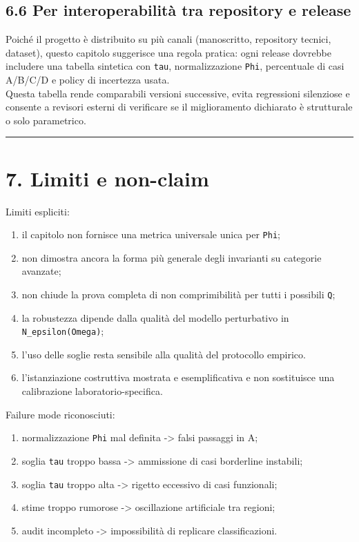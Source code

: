 \subsection{6.6 Per interoperabilità tra repository e release}

Poiché il progetto è distribuito su più canali (manoscritto, repository tecnici, dataset), questo capitolo suggerisce una regola pratica: ogni release dovrebbe includere una tabella sintetica con \texttt{tau}, normalizzazione \texttt{Phi}, percentuale di casi A/B/C/D e policy di incertezza usata.\\
Questa tabella rende comparabili versioni successive, evita regressioni silenziose e consente a revisori esterni di verificare se il miglioramento dichiarato è strutturale o solo parametrico.

\begin{center}\rule{0.5\linewidth}{0.5pt}\end{center}

\section{7. Limiti e non-claim}

Limiti espliciti:

\begin{enumerate}
\def\labelenumi{\arabic{enumi}.}
\tightlist
\item
  il capitolo non fornisce una metrica universale unica per \texttt{Phi};
\item
  non dimostra ancora la forma più generale degli invarianti su categorie avanzate;
\item
  non chiude la prova completa di non comprimibilità per tutti i possibili \texttt{Q};
\item
  la robustezza dipende dalla qualità del modello perturbativo in \texttt{N\_epsilon(Omega)};
\item
  l'uso delle soglie resta sensibile alla qualità del protocollo empirico.
\item
  l'istanziazione costruttiva mostrata e esemplificativa e non sostituisce una calibrazione laboratorio-specifica.
\end{enumerate}

Failure mode riconosciuti:

\begin{enumerate}
\def\labelenumi{\arabic{enumi}.}
\tightlist
\item
  normalizzazione \texttt{Phi} mal definita -\textgreater{} falsi passaggi in A;
\item
  soglia \texttt{tau} troppo bassa -\textgreater{} ammissione di casi borderline instabili;
\item
  soglia \texttt{tau} troppo alta -\textgreater{} rigetto eccessivo di casi funzionali;
\item
  stime troppo rumorose -\textgreater{} oscillazione artificiale tra regioni;
\item
  audit incompleto -\textgreater{} impossibilità di replicare classificazioni.
\end{enumerate}

